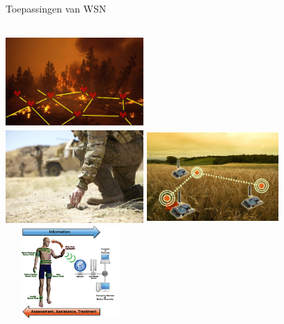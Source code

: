 \documentclass[presentation, bigger]{beamer}
\begin{document}
\begin{frame}[label=sec-1-2]{Toepassingen van WSN}

\begin{columns}[t]
\centering
\includegraphics[width=5.25cm,height=3.5cm]{graphics/sample_applications/fire.jpg}\\
\includegraphics[width=5.25cm,height=3.5cm]{graphics/sample_applications/military.jpg}
\centering
\includegraphics[width=5cm,height=3.5cm]{graphics/sample_applications/landbouw.jpg}\\
\includegraphics[width=5cm,height=3.5cm]{graphics/sample_applications/medicine.jpg}
\end{columns}

\end{frame}
\end{document}
